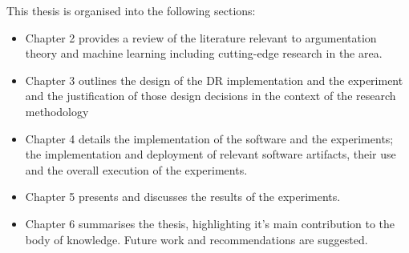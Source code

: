 This thesis is organised into the following sections:

\begin{itemize}

  \item Chapter 2 provides a review of the literature relevant to argumentation theory and machine learning including cutting-edge research in the area.
  \item Chapter 3 outlines the design of the DR implementation and the experiment and the justification of those design decisions in the context of the research methodology
  \item Chapter 4 details the implementation of the software and the experiments; the implementation and deployment of relevant software artifacts, their use and the overall execution of the experiments.
  \item Chapter 5 presents and discusses the results of the experiments.
  \item Chapter 6 summarises the thesis, highlighting it's main contribution to the body of knowledge. Future work and recommendations are suggested.

\end{itemize}
